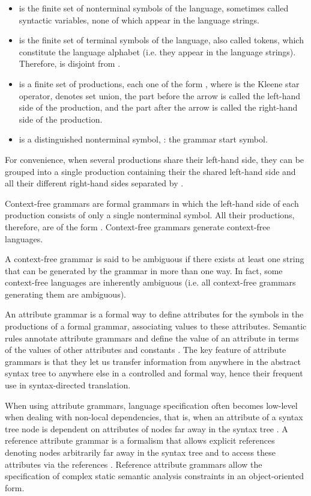 \documentclass[preprint]{elsarticle}
\begin{document}
\begin{itemize}
\item  is the finite set of nonterminal symbols of the language, sometimes called syntactic variables, none of which appear in the language strings.
\item  is the finite set of terminal symbols of the language, also called tokens, which constitute the language alphabet (i.e. they appear in the language strings).
      Therefore,  is disjoint from .
\item  is a finite set of productions, each one of the form , where  is the Kleene star operator,  denotes set union, the part before the arrow is called the left-hand side of the production, and the part after the arrow is called the right-hand side of the production.
\item  is a distinguished nonterminal symbol, : the grammar start symbol.
\end{itemize}

For convenience, when several productions share their left-hand side, they can be grouped into a single production containing their the shared left-hand side and all their different right-hand sides separated by .

Context-free grammars are formal grammars in which the left-hand side of each production consists of only a single nonterminal symbol.
All their productions, therefore, are of the form . Context-free grammars generate context-free languages.

A context-free grammar is said to be ambiguous if there exists at least one string that can be generated by the grammar in more than one way.
In fact, some context-free languages are inherently ambiguous (i.e. all context-free grammars generating them are ambiguous).

An attribute grammar is a formal way to define attributes for the symbols in the productions of a formal grammar, associating values to these attributes.
Semantic rules annotate attribute grammars and define the value of an attribute in terms of the values of other attributes and constants \cite{Aho2006}.
The key feature of attribute grammars is that they let us transfer information from anywhere in the abstract syntax tree to anywhere else in a controlled and formal way, hence their frequent use in syntax-directed translation.

When using attribute grammars, language specification often becomes low-level when dealing with non-local dependencies, that is, when an attribute of a syntax tree node is dependent on attributes of nodes far away in the syntax tree \cite{boyland:98fiber}.
A reference attribute grammar is a formalism that allows explicit references denoting nodes arbitrarily far away in the syntax tree and to access these attributes via the references \cite{Hedin1987}.
Reference attribute grammars allow the specification of complex static semantic analysis constraints in an object-oriented form.
\end{document}
